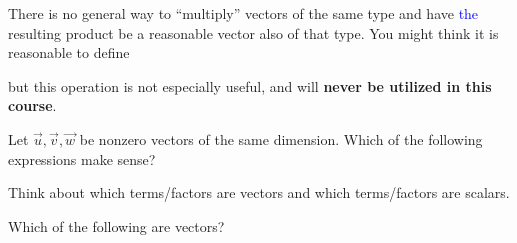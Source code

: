 \documentclass{ximera}
\begin{document}
\begin{warning}
  There is no general way to ``multiply'' vectors of the same type and
  have \textcolor{blue}{the} resulting product be a reasonable vector also of that type.
  You might think it is reasonable to define
  \begin{center}
  \end{center}
but this operation is not especially useful, and will \textbf{never be
  utilized in this course}.
\end{warning}

\begin{question}
  Let $\vec{u},\vec{v},\vec{w}$ be nonzero vectors of the same dimension. Which of
  the following expressions make sense?
  \begin{selectAll}
  \end{selectAll}
  \begin{hint}
    Think about which terms/factors are vectors and which
    terms/factors are scalars.
  \end{hint}
  \begin{question}
    Which of the following are vectors?
    \begin{selectAll}
    \end{selectAll}
  \end{question}
\end{question}
\end{document}
